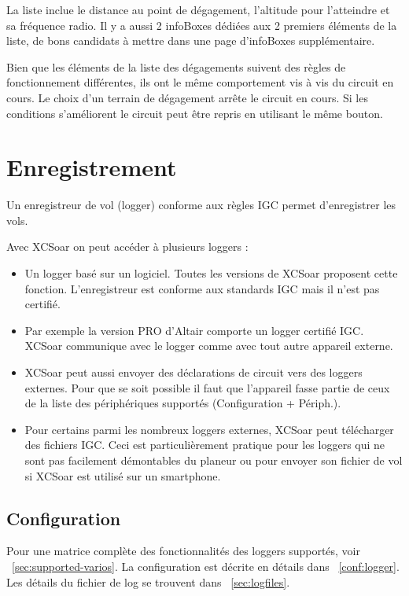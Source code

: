 La liste inclue le distance au point de dégagement, l'altitude pour l'atteindre et sa fréquence radio. Il y a aussi 2 infoBoxes dédiées aux 2 premiers éléments de la liste, de bons candidats à mettre dans une page d'infoBoxes supplémentaire.

Bien que les éléments de la liste des dégagements suivent des règles de fonctionnement différentes, ils ont le même comportement vis à vis du circuit en cours. Le choix d'un terrain de dégagement arrête le circuit en cours. Si les conditions s'améliorent le circuit peut être repris en utilisant le même bouton.

\section{Enregistrement}\label{sec:logger}

Un enregistreur de vol (logger) conforme aux règles IGC permet d'enregistrer les vols.

Avec XCSoar on peut accéder à plusieurs loggers :
\begin{itemize}
\item Un logger basé sur un logiciel. Toutes les versions de XCSoar proposent cette fonction. L'enregistreur est conforme aux standards IGC mais il n'est pas certifié.
\item Par exemple la version PRO d'Altair comporte un logger certifié IGC. XCSoar communique avec le logger comme avec tout autre appareil externe.
\item XCSoar peut aussi envoyer des déclarations de circuit vers des loggers externes. Pour que se soit possible il faut que l'appareil fasse partie de ceux de la liste des périphériques supportés (Configuration + Périph.). 
\item  Pour certains parmi les nombreux loggers externes, XCSoar peut télécharger des fichiers IGC. Ceci est particulièrement pratique pour les loggers qui ne sont pas facilement démontables du planeur ou pour envoyer son fichier de vol si XCSoar est utilisé sur un smartphone.
\end{itemize}

\subsection*{Configuration}
Pour une matrice complète des fonctionnalités des loggers supportés, voir ~\ref{sec:supported-varios}.
La configuration est décrite en détails dans ~\ref{conf:logger}. Les détails du fichier de log se trouvent dans ~\ref{sec:logfiles}.

